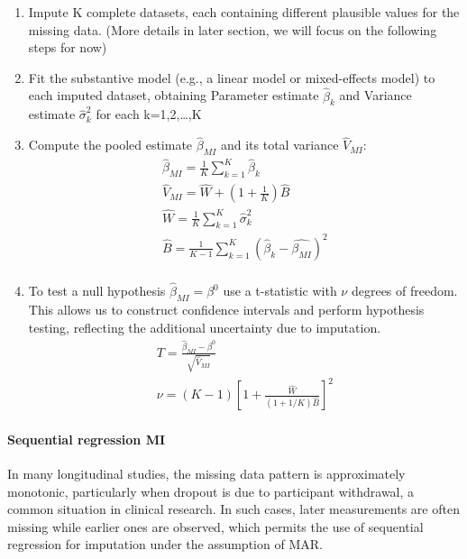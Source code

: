 \documentclass{article}
\begin{document}
\begin{enumerate}
\def\labelenumi{\arabic{enumi}.}
\item
  Impute K complete datasets, each containing different plausible values
  for the missing data. (More details in later section, we will focus on
  the following steps for now)
\item
  Fit the substantive model (e.g., a linear model or mixed-effects
  model) to each imputed dataset, obtaining Parameter estimate
  \(\hat{\beta}_{k}\) and Variance estimate \(\hat{\sigma}_{k}^{2}\) for
  each k=1,2,\ldots,K
\item
  Compute the pooled estimate \(\hat{\beta}_{MI}\) and its total
  variance \(\hat{V}_{MI}\): \begin{align*}
    \hat{\beta}_{MI} = \frac{1}{K} \sum_{k=1}^{K}{\hat{\beta}_{k}} \\
    \hat{V}_{MI} = \hat{W} + (1 + \frac{1}{K}) \hat{B} \\
    \hat{W} = \frac{1}{K} \sum^{K}_{k=1}{\hat{\sigma}^{2}_{k}} \\
    \hat{B} = \frac{1}{K-1} \sum^{K}_{k=1}({\hat{\beta}_{k}} - \hat{\beta_{MI}})^{2} \\
    \end{align*}
\item
  To test a null hypothesis \(\hat{\beta}_{MI} = \beta^{0}\) use a
  t-statistic with \(\nu\) degrees of freedom. This allows us to
  construct confidence intervals and perform hypothesis testing,
  reflecting the additional uncertainty due to imputation.
  \begin{align*}
    T = \frac{\hat{\beta}_{MI} - \beta^{0}}  {\sqrt{\hat{V}_{MI}}} \\
    \nu = (K-1)[1 + \frac{\hat{W}}{(1 + 1/K) \hat{B}}]^{2}
    \end{align*}
\end{enumerate}

\paragraph{Sequential regression MI}\label{sequential-regression-mi}

In many longitudinal studies, the missing data pattern is approximately
monotonic, particularly when dropout is due to participant withdrawal, a
common situation in clinical research. In such cases, later measurements
are often missing while earlier ones are observed, which permits the use
of sequential regression for imputation under the assumption of MAR.
\end{document}

